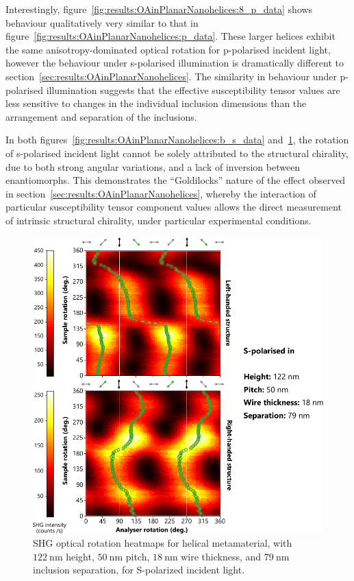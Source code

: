 Interestingly, figure~\ref{fig:results:OAinPlanarNanohelices:8_p_data} shows behaviour qualitatively very similar to that in figure~\ref{fig:results:OAinPlanarNanohelices:p_data}. These larger helices exhibit the same anisotropy-dominated optical rotation for p-polarised incident light, however the behaviour under s-polarised illumination is dramatically different to section~\ref{sec:results:OAinPlanarNanohelices}. The similarity in behaviour under p-polarised illumination suggests that the effective susceptibility tensor values are less sensitive to changes in the individual inclusion dimensions than the arrangement and separation of the inclusions.

In both figures~\ref{fig:results:OAinPlanarNanohelices:b_s_data} and~\ref{fig:results:OAinPlanarNanohelices:8_s_data}, the rotation of s-polarised incident light cannot be solely attributed to the structural chirality, due to both strong angular variations, and a lack of inversion between enantiomorphs. This demonstrates the ``Goldilocks'' nature of the effect observed in section~\ref{sec:results:OAinPlanarNanohelices}, whereby the interaction of particular susceptibility tensor component values allows the direct measurement of intrinsic structural chirality, under particular experimental conditions.
\begin{figure}[htb!]	
    \centering	
    \includegraphics[scale=1]{./figures/results/OAinPlanarNanohelices/8_s_data.pdf}
    \caption{\label{fig:results:OAinPlanarNanohelices:8_s_data}
    SHG optical rotation heatmaps for helical metamaterial, with $\SI{122}{\nano\m}$ height, $\SI{50}{\nano\m}$ pitch, $\SI{18}{\nano\m}$ wire thickness, and $\SI{79}{\nano\m}$ inclusion separation, for S-polarized incident light.}	
\end{figure}

